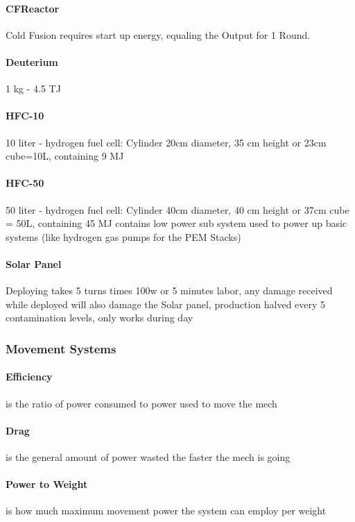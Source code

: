 \paragraph {CFReactor} Cold Fusion requires start up energy, equaling the Output for 1 Round.
\paragraph {Deuterium} 1 kg - 4.5 TJ
\paragraph {HFC-10} 10 liter - hydrogen fuel cell: Cylinder 20cm diameter,
35 cm height or 23cm cube=10L, containing 9 MJ
\paragraph {HFC-50} 50 liter - hydrogen fuel cell: Cylinder 40cm diameter,
40 cm height or 37cm cube = 50L, containing 45 MJ
contains low power sub system
used to power up basic systems (like hydrogen gas pumps for the PEM Stacks)

\paragraph {Solar Panel} Deploying takes 5 turns times 100w or 5 minutes labor, any damage received while deployed
will also damage the Solar panel, production halved every 5 contamination levels, only works during day

\subsubsection{Movement Systems}\label{sec:movementsystems}
\paragraph{Efficiency} is the ratio of power consumed to power used to move the mech
\paragraph{Drag} is the general amount of power wasted the faster the mech is going
\paragraph{Power to Weight} is how much maximum movement power the system can employ per weight

